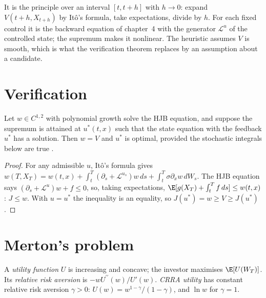 It is the  principle over an interval $[t, t + h]$ with $h \to 0$: expand $V(t + h,
X_{t+h})$ by Itô's formula, take expectations, divide by $h$. For each fixed control it is the backward
equation of chapter~4 with the generator $\mathcal L^u$ of the controlled state; the supremum makes it
nonlinear. The heuristic assumes $V$ is smooth, which is what the verification theorem replaces by an
assumption about a candidate.

\section{Verification}

\begin{theorem}[Verification]\label{thm:qm:stochastic-control:verification}
Let $w \in C^{1,2}$ with polynomial growth solve the HJB equation, and suppose the supremum is attained at
$u^*(t, x)$ such that the state equation with the feedback $u^*$ has a solution. Then $w = V$ and $u^*$ is
optimal, provided the stochastic integrals below are true .
\end{theorem}

\begin{proof}
For any admissible $u$, Itô's formula gives $w(T, X_T) = w(t, x) + \int_t^T(\partial_s + \mathcal L^{u_s})w\,ds + \int_t^T\sigma
\partial_xw\,dW_s$. The HJB equation says $(\partial_s + \mathcal L^u)w + f \le 0$, so, taking expectations, $\E[g(X_T) + \int_t^Tf\,ds] \le
w(t, x)$: $J \le w$. With $u = u^*$ the inequality is an equality, so $J(u^*) = w \ge V \ge J(u^*)$.
\end{proof}

\section{Merton's problem}

\begin{definition}\label{def:qm:stochastic-control:utility}
A \emph{utility function} $U$ is increasing and concave; the investor maximises
$\E[U(W_T)]$. Its \emph{relative risk aversion} is $-wU^{\prime\prime}(w)/U'(w)$.
\emph{CRRA utility} has constant relative risk aversion $\gamma > 0$: $U(w) =
w^{1-\gamma}/(1 - \gamma)$, and $\ln w$ for $\gamma = 1$.
\end{definition}

